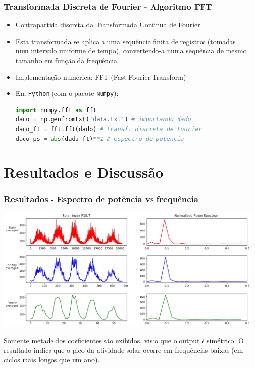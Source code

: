 \documentclass{beamer}
\begin{document}
\begin{frame}[fragile]
\frametitle{Transformada Discreta de Fourier - Algoritmo FFT}
\begin{itemize}
\item Contrapartida discreta da Transformada Contínua de Fourier
\item Esta transformada se aplica a uma sequência finita de registros (tomadas num intervalo uniforme de tempo), convertendo-a numa sequência de mesmo tamanho em função da frequência
\item Implementação numérica: FFT (Fast Fourier Transform)
\item Em \texttt{Python} (com o pacote \texttt{Numpy}):
\begin{lstlisting}[language=python,style=mystyle2]
import numpy.fft as fft
dado = np.genfromtxt('data.txt') # importando dado
dado_ft = fft.fft(dado) # transf. discreta de Fourier
dado_ps = abs(dado_ft)**2 # espectro de potencia 
\end{lstlisting}
\end{itemize}
\end{frame}


\section{Resultados e Discussão}

\begin{frame}
\frametitle{Resultados - Espectro de potência vs frequência}
\begin{center}
\includegraphics[scale=0.376]{Figuras/final_f.jpg}
\end{center}
\small
Somente metade dos coeficientes são exibidos, visto que o output é simétrico. O resultado indica que o pico da atividade solar ocorre em frequências baixas (em ciclos mais longos que um ano).
\end{frame}
\end{document}
